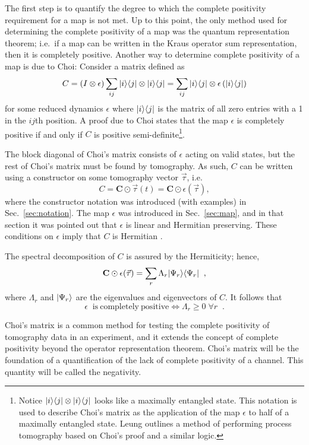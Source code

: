 The first step is to quantify the degree to which the complete positivity requirement for a map is not met.  Up to this point, the only method used for determining the complete positivity of a map was the quantum representation theorem; i.e.\ if a map can be written in the Kraus operator sum representation, then it is completely positive.  Another way to determine complete positivity of a map is due to Choi:  Consider a matrix defined as
$$
C = \left(I \otimes \epsilon\right)\sum_{ij} |i\rangle\langle j| \otimes |i\rangle\langle j| = \sum_{ij} |i\rangle\langle j| \otimes \epsilon\left( |i\rangle\langle j| \right)
$$
for some reduced dynamics $\epsilon$ where $|i\rangle\langle j|$ is the matrix of all zero entries with a 1 in the $ij$th position.  A proof due to Choi \cite{Choi1975} states that the map $\epsilon$ is completely positive if and only if $C$ is positive semi-definite\footnote{Notice $|i\rangle\langle j|\otimes |i\rangle\langle j|$ looks like a maximally entangled state.  This notation is used to describe Choi's matrix as the application of the map $\epsilon$ to half of a maximally entangled state.  Leung \cite{Leung2003} outlines a method of performing process tomography based on Choi's proof and a similar logic.}.  

The block diagonal of Choi's matrix consists of $\epsilon$ acting on valid states, but the rest of Choi's matrix must be found by tomography.  As such, $C$ can be written using a constructor on some tomography vector $\vec{\tau}$, i.e.\
$$
C = \mathbf{C}\odot\vec{\tau}(t) = \mathbf{C}\odot\epsilon\left(\vec{\tau}\right),
$$
where the constructor notation was introduced (with examples) in Sec.\ \ref{sec:notation}.  The map $\epsilon$ was introduced in Sec.\ \ref{sec:map}, and in that section it was pointed out that $\epsilon$ is linear and Hermitian preserving.   These conditions on $\epsilon$ imply that $C$ is Hermitian \cite{Choi1975,Shaji2005}.

The spectral decomposition of $C$ is assured by the Hermiticity; hence,
$$
\mathbf{C}\odot\epsilon(\vec{\tau}) = \sum_r \Lambda_r |\Psi_r\rangle\langle\Psi_r|\;\;,
$$
where $\Lambda_r$ and $\left|\Psi_r\right\rangle$ are the eigenvalues and eigenvectors of $C$.  It follows that 
$$
\epsilon\;\;\mathrm{is\ completely\ positive}\Leftrightarrow\Lambda_r\ge 0\;\forall r\;\;.
$$  

Choi's matrix is a common method for testing the complete positivity of tomography data in an experiment, and it extends the concept of complete positivity beyond the operator representation theorem.  Choi's matrix will be the foundation of a quantification of the lack of complete positivity of a channel.  This quantity will be called the negativity.

